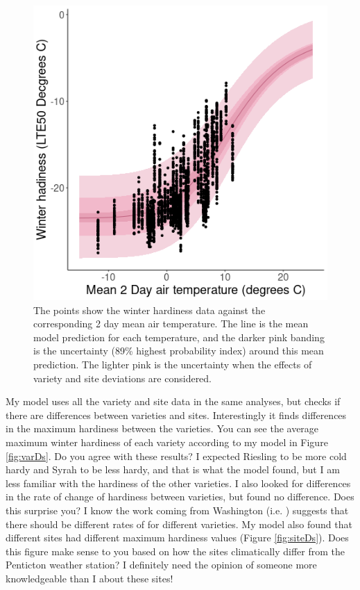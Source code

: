 \documentclass[11pt,letter]{article}
\begin{document}
\begin{figure}[h]
  \includegraphics[scale = 0.5]{PredWithReal.png}
  \caption{The points show the winter hardiness data against the corresponding 2 day mean air temperature. The line is the mean model prediction for each temperature, and the darker pink banding is the uncertainty (89\% highest probability index) around this mean prediction. The lighter pink is the uncertainty when the effects of variety and site deviations are considered.}
  \label{fig:predWithReal}
\end{figure}

My model uses all the variety and site data in the same analyses, but checks if there are differences between varieties and sites. Interestingly it finds differences in the maximum hardiness between the varieties. You can see the average maximum winter hardiness of each variety according to my model in Figure \ref{fig:varDs}. Do you agree with these results? I expected Riesling to be more cold hardy and Syrah to be less hardy, and that is what the model found, but I am less familiar with the hardiness of the other varieties. I also looked for differences in the rate of change of hardiness between varieties, but found no difference. Does this surprise you? I know the work coming from Washington (i.e. \cite{Ferguson2014,Ferguson2011}) suggests that there should be different rates of for different varieties. My model also found that different sites had different maximum hardiness values (Figure \ref{fig:siteDs}). Does this figure make sense to you based on how the sites climatically differ from the Penticton weather station? I definitely need the opinion of someone more knowledgeable than I about these sites! \\
\end{document}
